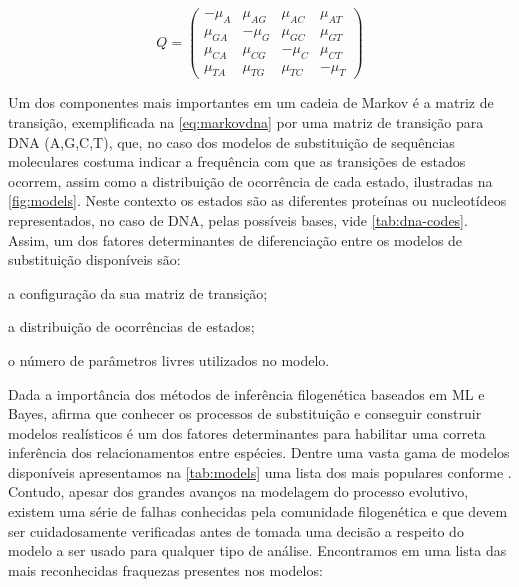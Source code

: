 \documentclass[english,brazilian]{UNISINOSmonografia} %
\begin{document}
\begin{equation}
\label{eq:markovdna}
Q = \begin{pmatrix}
-\mu_A & \mu_{AG} & \mu_{AC} & \mu_{AT} \\
\mu_{GA} & -\mu_G   & \mu_{GC} & \mu_{GT} \\
\mu_{CA} & \mu_{CG} & -\mu_C   & \mu_{CT} \\
\mu_{TA} & \mu_{TG} & \mu_{TC} & -\mu_T 
\end{pmatrix}
\end{equation}


Um dos componentes mais importantes em um cadeia de Markov é a matriz de transição, exemplificada na \autoref{eq:markovdna} por uma matriz de transição para DNA (A,G,C,T), que, no caso dos modelos de substituição de sequências moleculares costuma indicar a frequência com que as transições de estados ocorrem, assim como a distribuição de ocorrência de cada estado, ilustradas na \autoref{fig:models}.
Neste contexto os estados são as diferentes proteínas ou nucleotídeos representados, no caso de DNA, pelas possíveis bases, vide \autoref{tab:dna-codes}.
Assim, um dos fatores determinantes de diferenciação entre os modelos de substituição disponíveis são: 
\begin{inparaenum} 
	\item a configuração da sua matriz de transição;
	\item a distribuição de ocorrências de estados;
	\item o número de parâmetros livres utilizados no modelo.
\end{inparaenum}

%
%

Dada a importância dos métodos de inferência filogenética baseados em ML e Bayes,  afirma que conhecer os processos de substituição e conseguir construir modelos realísticos é um dos fatores determinantes para habilitar uma correta inferência dos relacionamentos entre espécies.
Dentre uma vasta gama de modelos disponíveis apresentamos na \autoref{tab:models} uma lista dos mais populares conforme .
Contudo, apesar dos grandes avanços na modelagem do processo evolutivo, existem uma série de falhas conhecidas pela comunidade filogenética e que devem ser cuidadosamente verificadas antes de tomada uma decisão a respeito do modelo a ser usado para qualquer tipo de análise.
Encontramos em  uma lista das mais reconhecidas fraquezas presentes nos modelos:
\end{document}
